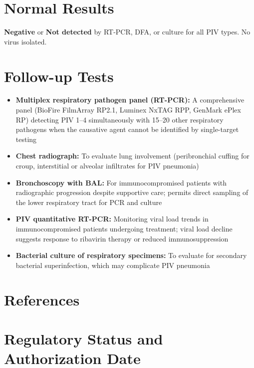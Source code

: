 \section*{Normal Results}
\textbf{Negative} or \textbf{Not detected} by RT-PCR, DFA, or culture for all PIV types. No virus isolated.

\section*{Follow-up Tests}
\begin{itemize}
  \item \textbf{Multiplex respiratory pathogen panel (RT-PCR):} A comprehensive panel (BioFire FilmArray RP2.1, Luminex NxTAG RPP, GenMark ePlex RP) detecting PIV 1--4 simultaneously with 15--20 other respiratory pathogens when the causative agent cannot be identified by single-target testing
  \item \textbf{Chest radiograph:} To evaluate lung involvement (peribronchial cuffing for croup, interstitial or alveolar infiltrates for PIV pneumonia)
  \item \textbf{Bronchoscopy with BAL:} For immunocompromised patients with radiographic progression despite supportive care; permits direct sampling of the lower respiratory tract for PCR and culture
  \item \textbf{PIV quantitative RT-PCR:} Monitoring viral load trends in immunocompromised patients undergoing treatment; viral load decline suggests response to ribavirin therapy or reduced immunosuppression
  \item \textbf{Bacterial culture of respiratory specimens:} To evaluate for secondary bacterial superinfection, which may complicate PIV pneumonia
\end{itemize}

\section*{References}



\clearpage
\section*{Regulatory Status and Authorization Date}

\clearpage
